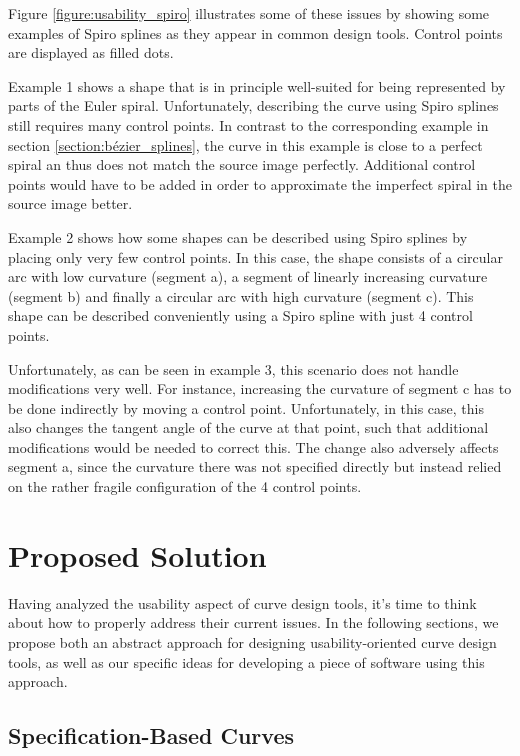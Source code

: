 \documentclass[a4paper]{article}
\begin{document}
				Figure \ref{figure:usability_spiro} illustrates some of these issues by showing some examples of Spiro splines as they appear in common design tools. Control points are displayed as filled dots.

				Example 1 shows a shape that is in principle well-suited for being represented by parts of the Euler spiral. Unfortunately, describing the curve using Spiro splines still requires many control points. In contrast to the corresponding example in section \ref{section:bézier_splines}, the curve in this example is close to a perfect spiral an thus does not match the source image perfectly. Additional control points would have to be added in order to approximate the imperfect spiral in the source image better.

				Example 2 shows how some shapes can be described using Spiro splines by placing only very few control points. In this case, the shape consists of a circular arc with low curvature (segment a), a segment of linearly increasing curvature (segment b) and finally a circular arc with high curvature (segment c). This shape can be described conveniently using a Spiro spline with just 4 control points.

				Unfortunately, as can be seen in example 3, this scenario does not handle modifications very well. For instance, increasing the curvature of segment c has to be done indirectly by moving a control point. Unfortunately, in this case, this also changes the tangent angle of the curve at that point, such that additional modifications would be needed to correct this. The change also adversely affects segment a, since the curvature there was not specified directly but instead relied on the rather fragile configuration of the 4 control points.

	\section{Proposed Solution}
	\label{section:proposed_solution}

		Having analyzed the usability aspect of curve design tools, it's time to think about how to properly address their current issues. In the following sections, we propose both an abstract approach for designing usability-oriented curve design tools, as well as our specific ideas for developing a piece of software using this approach.

		\subsection{Specification-Based Curves}
		\label{section:specification-based_curves}
\end{document}
